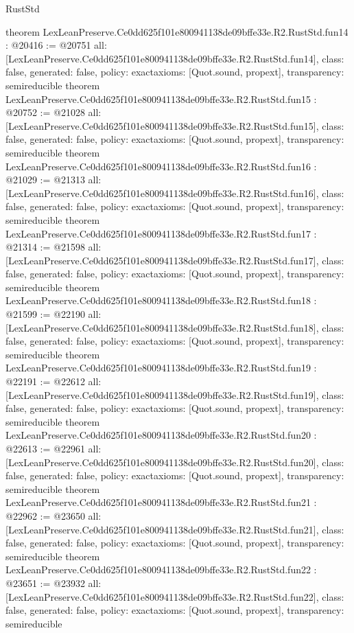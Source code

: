 \begin{lexlean}{RustStd}
\begin{coremodule}
{}
theorem LexLeanPreserve.Ce0dd625f101e800941138de09bffe33e.R2.RustStd.fun14 : @20416 := @20751 {
  all: [LexLeanPreserve.Ce0dd625f101e800941138de09bffe33e.R2.RustStd.fun14],
  class: false,
  generated: false,
  policy: exact{axioms: [Quot.sound, propext]},
  transparency: semireducible
}
theorem LexLeanPreserve.Ce0dd625f101e800941138de09bffe33e.R2.RustStd.fun15 : @20752 := @21028 {
  all: [LexLeanPreserve.Ce0dd625f101e800941138de09bffe33e.R2.RustStd.fun15],
  class: false,
  generated: false,
  policy: exact{axioms: [Quot.sound, propext]},
  transparency: semireducible
}
theorem LexLeanPreserve.Ce0dd625f101e800941138de09bffe33e.R2.RustStd.fun16 : @21029 := @21313 {
  all: [LexLeanPreserve.Ce0dd625f101e800941138de09bffe33e.R2.RustStd.fun16],
  class: false,
  generated: false,
  policy: exact{axioms: [Quot.sound, propext]},
  transparency: semireducible
}
theorem LexLeanPreserve.Ce0dd625f101e800941138de09bffe33e.R2.RustStd.fun17 : @21314 := @21598 {
  all: [LexLeanPreserve.Ce0dd625f101e800941138de09bffe33e.R2.RustStd.fun17],
  class: false,
  generated: false,
  policy: exact{axioms: [Quot.sound, propext]},
  transparency: semireducible
}
theorem LexLeanPreserve.Ce0dd625f101e800941138de09bffe33e.R2.RustStd.fun18 : @21599 := @22190 {
  all: [LexLeanPreserve.Ce0dd625f101e800941138de09bffe33e.R2.RustStd.fun18],
  class: false,
  generated: false,
  policy: exact{axioms: [Quot.sound, propext]},
  transparency: semireducible
}
theorem LexLeanPreserve.Ce0dd625f101e800941138de09bffe33e.R2.RustStd.fun19 : @22191 := @22612 {
  all: [LexLeanPreserve.Ce0dd625f101e800941138de09bffe33e.R2.RustStd.fun19],
  class: false,
  generated: false,
  policy: exact{axioms: [Quot.sound, propext]},
  transparency: semireducible
}
theorem LexLeanPreserve.Ce0dd625f101e800941138de09bffe33e.R2.RustStd.fun20 : @22613 := @22961 {
  all: [LexLeanPreserve.Ce0dd625f101e800941138de09bffe33e.R2.RustStd.fun20],
  class: false,
  generated: false,
  policy: exact{axioms: [Quot.sound, propext]},
  transparency: semireducible
}
theorem LexLeanPreserve.Ce0dd625f101e800941138de09bffe33e.R2.RustStd.fun21 : @22962 := @23650 {
  all: [LexLeanPreserve.Ce0dd625f101e800941138de09bffe33e.R2.RustStd.fun21],
  class: false,
  generated: false,
  policy: exact{axioms: [Quot.sound, propext]},
  transparency: semireducible
}
theorem LexLeanPreserve.Ce0dd625f101e800941138de09bffe33e.R2.RustStd.fun22 : @23651 := @23932 {
  all: [LexLeanPreserve.Ce0dd625f101e800941138de09bffe33e.R2.RustStd.fun22],
  class: false,
  generated: false,
  policy: exact{axioms: [Quot.sound, propext]},
  transparency: semireducible
}
\end{coremodule}
\end{lexlean}
